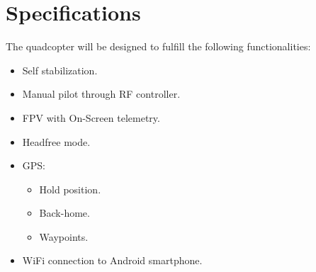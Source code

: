 \section{Specifications}
The quadcopter will be designed to fulfill the following functionalities:
\begin{itemize}
\item Self stabilization.
\item Manual pilot through RF controller.
\item FPV with On-Screen telemetry.
\item Headfree mode.
\item GPS:
\begin{itemize}
\item Hold position.
\item Back-home.
\item Waypoints.
\end{itemize}
\item WiFi connection to Android smartphone.
\end{itemize}